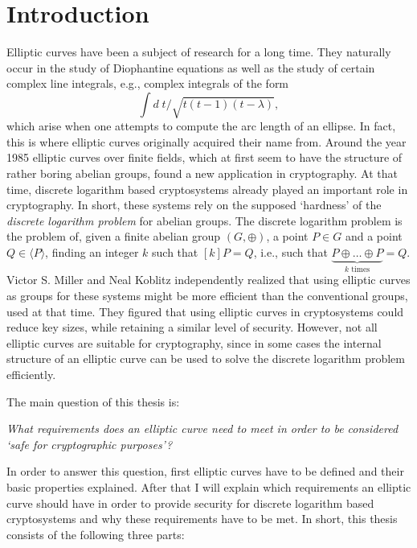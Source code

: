 \documentclass{article}
\numberwithin{equation}{section}
\theoremstyle{definition}
\newcommand{\grgen}[1]{\langle #1 \rangle} %
\begin{document}
\section*{Introduction}
Elliptic curves have been a subject of research for a long time. They naturally occur in the study of Diophantine equations as well as the study of certain complex line integrals, e.g., complex integrals of the form $$ \int d\;t/\sqrt{t(t-1)(t-\lambda)}, $$ which arise when one attempts to compute the arc length of an ellipse. In fact, this is where elliptic curves originally acquired their name from. Around the year 1985 elliptic curves over finite fields, which at first seem to have the structure of rather boring abelian groups, found a new application in cryptography. At that time, discrete logarithm based cryptosystems already played an important role in cryptography. In short, these systems rely on the supposed `hardness' of the \emph{discrete logarithm problem} for abelian groups. The discrete logarithm problem is the problem of, given a finite abelian group $(G,\oplus)$, a point $P\in G$ and a point $Q\in\grgen{P}$, finding an integer $k$ such that $[k]P=Q$, i.e., such that $\underbrace{P\oplus \ldots \oplus P}_{k \text{ times}}=Q$. Victor S. Miller \cite{Miller} and Neal Koblitz \cite{Koblitz} independently realized that using elliptic curves as groups for these systems might be more efficient than the conventional groups, used at that time. They figured that using elliptic curves in cryptosystems could reduce key sizes, while retaining a similar level of security. However, not all elliptic curves are suitable for cryptography, since in some cases the internal structure of an elliptic curve can be used to solve the discrete logarithm problem efficiently.\par  
The main question of this thesis is:
\begin{center} 
\emph{What requirements does an elliptic curve need to meet in order to be considered `safe for cryptographic purposes'?}
\end{center}
In order to answer this question, first elliptic curves have to be defined and their basic properties explained. After that I will explain which requirements an elliptic curve should have in order to provide security for discrete logarithm based cryptosystems and why these requirements have to be met. In short, this thesis consists of the following three parts:
\end{document}
